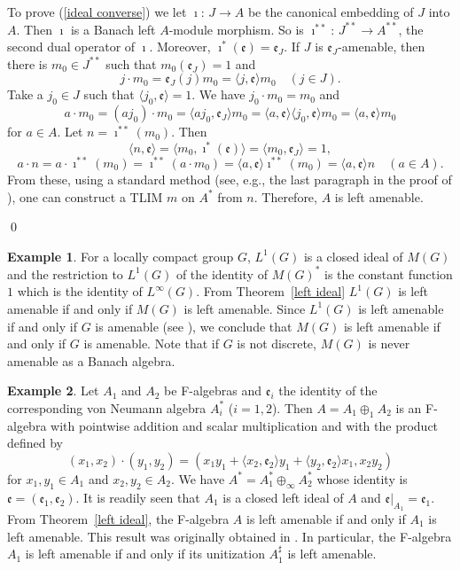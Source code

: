 \documentclass{tran-l}
\numberwithin{equation}{section}
\theoremstyle{definition}
\newtheorem{exa}{Example}
\theoremstyle{remark}
\begin{document}
To prove (\ref{ideal converse}) we let $\imath$: $J\to  A$ be the canonical embedding of $J$ into $ A$. Then $\imath$ is a Banach left $ A$-module morphism. So is $\imath^{**}$: $J^{**} \to  A^{**}$, the second dual operator of $\imath$. Moreover, $\imath^*({\mathfrak{e}}) = {\mathfrak{e}}_J$. If $J$ is ${\mathfrak{e}}_J$-amenable, then there is $m_0\in J^{**}$ such that $ m_0({\mathfrak{e}}_J) = 1$ and
\[
j\cdot m_0 = {\mathfrak{e}}_J(j) m_0 = {\langle} j, {\mathfrak{e}} {\rangle} m_0\quad (j\in J).
\]
 Take a $j_0\in J$ such that ${\langle} j_0, {\mathfrak{e}} {\rangle} = 1$. We have 
$j_0\cdot m_0 = m_0$ and 
\[
a\cdot m_0 = (aj_0)\cdot m_0 = {\langle} aj_0, {\mathfrak{e}}_J {\rangle} m_0 = {\langle} a, {\mathfrak{e}} {\rangle} {\langle} j_0, {\mathfrak{e}} {\rangle} m_0 = {\langle} a,{\mathfrak{e}}{\rangle} m_0
\]
for $a\in  A$. Let $n = \imath^{**}(m_0)$. Then 
\[
{\langle} n, {\mathfrak{e}}{\rangle} = {\langle} m_0, \imath^*({\mathfrak{e}}){\rangle} = {\langle} m_0, {\mathfrak{e}}_J{\rangle} = 1, 
\]
\[
a\cdot n = a \cdot \imath^{**}(m_0) = \imath^{**}(a\cdot m_0) = {\langle} a, {\mathfrak{e}} {\rangle}\imath^{**}(m_0) = {\langle} a, {\mathfrak{e}} {\rangle} n \quad (a\in  A).
\]
From these, using a standard method (see, e.g., the last paragraph in the proof of \cite[Theorem~4.1]{Lau_F}), one can construct a TLIM $m$ on $A^*$ from $n$. Therefore, $ A$ is left amenable.

\qed

\begin{exa}
For a locally compact group $G$, $L^1(G)$ is a closed ideal of $M(G)$ and the restriction to $L^1(G)$ of the identity of $M(G)^*$ is the constant function $1$ which is the identity of $L^\infty(G)$. From Theorem~\ref{left ideal} $L^1(G)$ is left amenable if and only if $M(G)$ is left amenable. Since $L^1(G)$ is left amenable if and only if $G$ is amenable 
(see \cite{Lau_F}), we conclude that $M(G)$ is left amenable if and only if $G$ is amenable. Note that if $G$ is not discrete, $M(G)$ is never amenable as a Banach algebra.
\end{exa}

\begin{exa}\label{A1+A2}
Let $A_1$ and $A_2$ be F-algebras and ${\mathfrak{e}}_i$ the identity of the corresponding von Neumann algebra $A_i^*$ ($i =1,2$). Then $A = A_1 \oplus_1 A_2$ is an F-algebra with pointwise addition and scalar multiplication and with the product defined by
\[
(x_1,x_2)\cdot (y_1,y_2) = (x_1y_1 +{\langle} x_2,{\mathfrak{e}}_2{\rangle} y_1 +{\langle} y_2,{\mathfrak{e}}_2{\rangle} x_1, x_2y_2) 
\]
for $x_1,y_1\in A_1$ and $x_2,y_2\in A_2$. We have $A^* = A_1^* \oplus_\infty A_2^*$ whose identity is ${\mathfrak{e}}=({\mathfrak{e}}_1,{\mathfrak{e}}_2)$. It is readily seen that $A_1$ is a closed left ideal of $A$ and ${\mathfrak{e}}|_{A_1} = {\mathfrak{e}}_1$. From Theorem~\ref{left ideal}, the F-algebra $A$ is left amenable if and only if $A_1$ is left amenable. This result was originally obtained in \cite[Proposition~4.5]{Lau_F}. In particular, the F-algebra $A_1$ is left amenable if and only if its unitization $A_1^\sharp$ is left amenable.
\end{exa}
\end{document}
